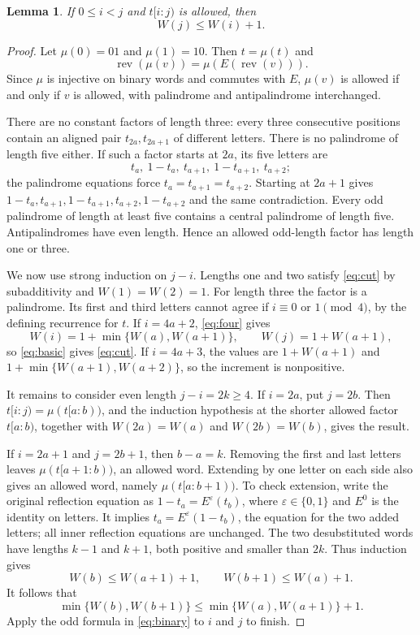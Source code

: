 \documentclass[11pt]{article}
\newtheorem{lemma}[theorem]{Lemma}
\newcommand{\rev}{\operatorname{rev}}
\begin{document}
\begin{lemma}\label{lem:cut}
If $0\leq i<j$ and $t[i:j)$ is allowed, then
\begin{equation}\label{eq:cut}
 W(j)\leq W(i)+1.
\end{equation}
\end{lemma}
\begin{proof}
Let $\mu(0)=01$ and $\mu(1)=10$. Then $t=\mu(t)$ and
\[
 \rev(\mu(v))=\mu(E(\rev(v))).
\]
Since $\mu$ is injective on binary words and commutes with $E$,
$\mu(v)$ is allowed if and only if $v$ is allowed, with palindrome and
antipalindrome interchanged.

There are no constant factors of length three: every three consecutive
positions contain an aligned pair $t_{2a},t_{2a+1}$ of different letters.
There is no palindrome of length five either. If such a factor starts
at $2a$, its five letters are
\[
 t_a,\ 1-t_a,\ t_{a+1},\ 1-t_{a+1},\ t_{a+2};
\]
the palindrome equations force $t_a=t_{a+1}=t_{a+2}$.
Starting at $2a+1$ gives
$1-t_a,t_{a+1},1-t_{a+1},t_{a+2},1-t_{a+2}$ and the same contradiction.
Every odd palindrome of length at least five contains a central
palindrome of length five. Antipalindromes have even length. Hence an
allowed odd-length factor has length one or three.

We now use strong induction on $j-i$. Lengths one and two satisfy
\eqref{eq:cut} by subadditivity and $W(1)=W(2)=1$.
For length three the factor is a palindrome. Its first and third letters
cannot agree if $i\equiv0$ or $1\pmod4$, by the defining recurrence for $t$.
If $i=4a+2$, \eqref{eq:four} gives
\[
 W(i)=1+\min\{W(a),W(a+1)\},\qquad W(j)=1+W(a+1),
\]
so \eqref{eq:basic} gives \eqref{eq:cut}.
If $i=4a+3$, the values are $1+W(a+1)$ and
$1+\min\{W(a+1),W(a+2)\}$, so the increment is nonpositive.

It remains to consider even length $j-i=2k\geq4$.
If $i=2a$, put $j=2b$. Then $t[i:j)=\mu(t[a:b))$,
and the induction hypothesis at the shorter allowed factor $t[a:b)$,
together with $W(2a)=W(a)$ and $W(2b)=W(b)$, gives the result.

If $i=2a+1$ and $j=2b+1$, then $b-a=k$.
Removing the first and last letters leaves
$\mu(t[a+1:b))$, an allowed word. Extending by one letter on each side
also gives an allowed word, namely $\mu(t[a:b+1))$.
To check extension, write the original reflection equation as
$1-t_a=E^\varepsilon(t_b)$, where $\varepsilon\in\{0,1\}$ and
$E^0$ is the identity on letters. It implies
$t_a=E^\varepsilon(1-t_b)$, the equation for the two added letters;
all inner reflection equations are unchanged.
The two desubstituted words have lengths $k-1$ and $k+1$, both positive
and smaller than $2k$. Thus induction gives
\[
 W(b)\leq W(a+1)+1,\qquad W(b+1)\leq W(a)+1.
\]
It follows that
\[
 \min\{W(b),W(b+1)\}\leq\min\{W(a),W(a+1)\}+1.
\]
Apply the odd formula in \eqref{eq:binary} to $i$ and $j$ to finish.
\end{proof}
\end{document}

